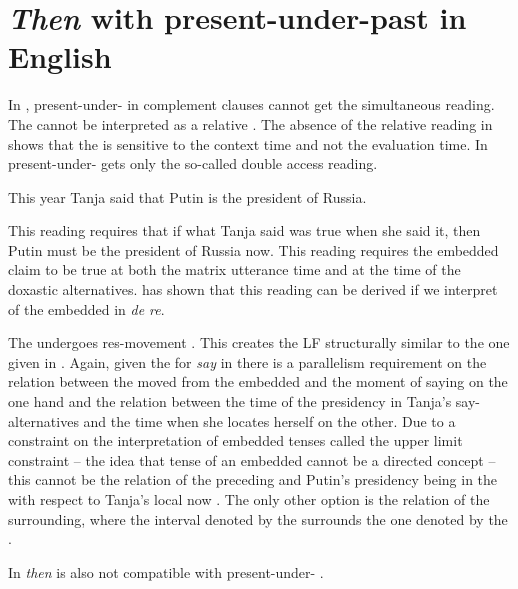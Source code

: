 \documentclass[output=paper,modfonts,newtxmath,hidelinks]{langscibook}
\begin{document}
\section{\textit{Then} with present-under-past in English}\label{20:s4}

In , present-under- in complement clauses cannot get the simultaneous reading. The   cannot be interpreted as a relative . The absence of the relative  reading in  shows that the   is sensitive to the context time and not the evaluation time. In  present-under- gets only the so-called double access reading.

\ea This year Tanja said that Putin is the president of Russia.\label{20:ex52}
\z

\noindent This reading requires that if what Tanja said was true when she said it, then Putin must be the president of Russia now. This reading requires the embedded claim to be true at both the matrix utterance time and at the time of the doxastic alternatives. \citet{Abusch1997} has shown that this reading can be derived if we interpret  of the embedded  in  \textit{de re}.\largerpage[-1]

The  undergoes res-movement \citep{Heim1994}. This creates the LF structurally similar to the one given in . Again, given the  for \textit{say} in  there is a parallelism requirement on the relation between the  moved from the embedded  and the  moment of saying on the one hand and the relation between the time of the presidency in Tanja’s say-alternatives and the time when she locates herself on the other. Due to a constraint on the interpretation of embedded tenses called the upper limit constraint -- the idea that tense of an embedded  cannot be a  directed concept -- this cannot be the relation of the  preceding  and Putin’s presidency being in the  with respect to Tanja’s local now \citep{Abusch1997}. The only other option is the relation of the surrounding, where the interval denoted by the  surrounds the one denoted by the .\

In  \textit{then} is also not compatible with present-under- .
\end{document}
